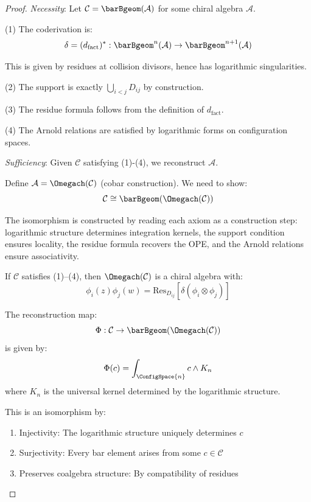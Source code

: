 \begin{proof}
\emph{Necessity}: Let $\mathcal{C} = \barBgeom(\mathcal{A})$ for some chiral algebra $\mathcal{A}$.

(1) The coderivation is:
\[\delta = (d_{\text{fact}})^*: \barBgeom^n(\mathcal{A}) \to \barBgeom^{n+1}(\mathcal{A})\]

This is given by residues at collision divisors, hence has logarithmic singularities.

(2) The support is exactly $\bigcup_{i<j} D_{ij}$ by construction.

(3) The residue formula follows from the definition of $d_{\text{fact}}$.

(4) The Arnold relations are satisfied by logarithmic forms on configuration spaces.

\emph{Sufficiency}: Given $\mathcal{C}$ satisfying (1)-(4), we reconstruct $\mathcal{A}$.

Define $\mathcal{A} = \Omegach(\mathcal{C})$ (cobar construction). We need to show:
\[\mathcal{C} \cong \barBgeom(\Omegach(\mathcal{C}))\]

The isomorphism is constructed by reading each axiom as a construction step: logarithmic structure determines integration kernels, the support condition ensures locality, the residue formula recovers the OPE, and the Arnold relations ensure associativity.

If $\mathcal{C}$ satisfies (1)--(4), then $\Omegach(\mathcal{C})$ is a chiral algebra with:
\[\phi_i(z)\phi_j(w) = \text{Res}_{D_{ij}}[\delta(\phi_i \otimes \phi_j)]\]

The reconstruction map:
\[\Phi: \mathcal{C} \to \barBgeom(\Omegach(\mathcal{C}))\]
is given by:
\[\Phi(c) = \int_{\ConfigSpace{n}} c \wedge K_n\]
where $K_n$ is the universal kernel determined by the logarithmic structure.

This is an isomorphism by:
\begin{enumerate}
\item Injectivity: The logarithmic structure uniquely determines $c$
\item Surjectivity: Every bar element arises from some $c \in \mathcal{C}$
\item Preserves coalgebra structure: By compatibility of residues
\end{enumerate}
\end{proof}

